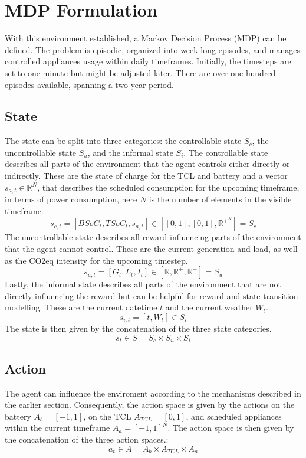 \documentclass{article}
\theoremstyle{plain}
\theoremstyle{definition}
\theoremstyle{remark}
\begin{document}
\section{MDP Formulation}
With this environment established, a Markov Decision Process (MDP) can be defined. The problem is episodic, organized into week-long episodes, and manages controlled appliances usage within daily timeframes. Initially, the timesteps are set to one minute but might be adjusted later. There are over one hundred episodes available, spanning a two-year period.

\subsection{State}
The state can be split into three categories: the controllable state $S_c$, the uncontrollable state $S_u$, and the informal state $S_i$. The controllable state describes all parts of the environment that the agent controls either directly or indirectly. These are the state of charge for the TCL and battery and a vector $s_{a,t} \in \mathbb{R}^{N}$, that describes the scheduled consumption for the upcoming timeframe, in terms of power consumption, here $N$ is the number of elements in the visible timeframe.
\begin{equation}
    s_{c, t} = [BSoC_t, TSoC_t, s_{a,t}] \in  [[0,1],[0,1],\mathbb{R}^{+^N}]= S_c
\end{equation}   
The uncontrollable state describes all reward influencing parts of the environment that the agent cannot control. These are the current generation and load, as well as the CO2eq intensity for the upcoming timestep.
\begin{equation}
    s_{u, t} = [G_t, L_t, I_t] \in [\mathbb{R}, \mathbb{R}^+, \mathbb{R}^+]= S_u
\end{equation}
Lastly, the informal state describes all parts of the environment that are not directly influencing the reward but can be helpful for reward and state transition modelling. These are the current datetime $t$ and the current weather $W_t$.
\begin{equation}
    s_{i,t} = [t, W_t] \in S_i
\end{equation}
The state is then given by the concatenation of the three state categories.
\begin{equation}
    s_t \in S = S_c \times S_u \times S_i
\end{equation}

\subsection{Action}
The agent can influence the enviroment according to the mechanisms described in the earlier section. Consequently, the action space is given by the actions on the battery $A_b = [-1, 1]$, on the TCL $A_{TCL} = [0, 1]$, and scheduled appliances within the current timeframe $A_a = [-1, 1]^N$. The action space is then given by the concatenation of the three action spaces.:
    \begin{equation}
        a_t \in A = A_b \times A_{TCL} \times A_a
    \end{equation}
\end{document}
